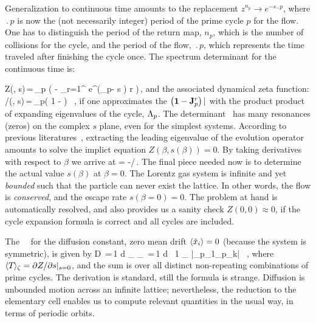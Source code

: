 Generalization to continuous time amounts to the
replacement
$ z^{n_p} \rightarrow e^{-s \period{p}} $, where $\period{p}$
is now the (not necessarily integer)
period of the prime cycle $p$ for the flow. One has to distinguish the
period of the return map, $n_p$, which is the number of collisions for
the cycle, and the period of the flow, $\period{p}$, which represents
the time traveled after finishing the cycle once. The spectrum
determinant for the continuous time is:

\beq
Z(\beta, s)\,=\,\prod_{p\in\PP} \exp \left( - {
 \sum_{r=1}^
 { e^{(\beta \cdot \hn_p- s ) r } %
  }
 } \right)\,,
\label{eq-det-cont}
\eeq
and the associated dynamical zeta function:
/\zeta(\beta, s)\,=\,\prod_{p}\left( 1 -  \right) ~,
\label{eq-zeta-cont}
\eeq
if one approximates the $\left( {\bf 1}-{\bf J}_p^{r} \right) |$ with
the product product of expanding eigenvalues of the cycle,
$\Lambda_p$. The determinant~ has many resonances
(zeros) on the complex $s$ plane, even for the simplest systems.
According to previous literatures~, extracting the leading
eigenvalue of the evolution operator amounts to solve the implict
equation $Z(\beta, s(\beta)) = 0$. By taking derivatives with respect
to $\beta$ we arrive at
\beq
{} = -/\,.
\eeq
The final piece needed now is to determine the actual value $s(\beta)$
at $\beta = 0$. The Lorentz gas system is infinite and yet
\emph{bounded} such that the particle can never exist the lattice.
In other words, the flow is \emph{conserved}, and the escape rate
$s(\beta = 0) = 0$. The problem at hand is automatically resolved, and
also provides us a sanity check $Z(0, 0)\approx 0$, if the cycle 
expansion formula is correct and all cycles are included.

The \dzeta\ \cycForm\ for the diffusion constant, zero mean drift
$ \langle { \hat{x}_i } \rangle = 0 $ (because the system is symmetric), is 
given by
 \beq 
 D \,=\,{1  d} { _\zeta \over
 \expct{\period{}}_\zeta } \,=\,{1  d } \, {1 \over
 \expct{\period{}}_\zeta} \sumprime {} {|\ExpaEig_{p_1}\cdots \ExpaEig_{p_k}|} \, ,
\label{eq-diff-ec}
\eeq
where $\langle {{\ensuremath{T_{}}}} \rangle_\zeta = \partial Z/\partial s\vert_{s = 0}$,
and the sum is over all distinct non-repeating combinations of prime
cycles. The derivation is standard, still the formula is strange.
Diffusion is unbounded motion across an infinite lattice;
nevertheless, the reduction to the elementary cell enables us to
compute relevant quantities in the usual way, in terms of periodic
orbits.
